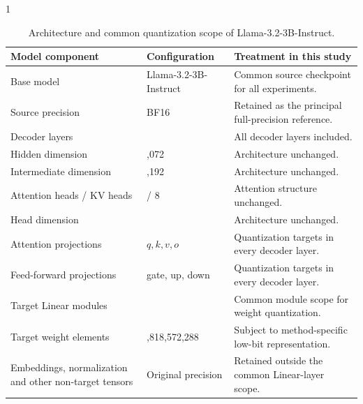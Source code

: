 \begin{table}[htbp]
\centering
\caption{Architecture and common quantization scope of
Llama-3.2-3B-Instruct.}
\label{tab:model-architecture-scope}

\begin{spacing}{1}
\small
\renewcommand{\arraystretch}{1.22}

\begin{tabularx}{\textwidth}{
@{}
>{\raggedright\arraybackslash}p{}
>{\raggedright\arraybackslash}p{}
>{\raggedright\arraybackslash}X
@{}
}
\toprule
\textbf{Model component} &
\textbf{Configuration} &
\textbf{Treatment in this study} \\
\midrule

Base model &
Llama-3.2-3B-Instruct &
Common source checkpoint for all experiments. \\

Source precision &
BF16 &
Retained as the principal full-precision reference. \\

Decoder layers &
28 &
All decoder layers included. \\

Hidden dimension &
3,072 &
Architecture unchanged. \\

Intermediate dimension &
8,192 &
Architecture unchanged. \\

Attention heads / KV heads &
24 / 8 &
Attention structure unchanged. \\

Head dimension &
128 &
Architecture unchanged. \\

Attention projections &
\(q,k,v,o\) &
Quantization targets in every decoder layer. \\

Feed-forward projections &
gate, up, down &
Quantization targets in every decoder layer. \\

Target Linear modules &
196 &
Common module scope for weight quantization. \\

Target weight elements &
2,818,572,288 &
Subject to method-specific low-bit representation. \\

Embeddings, normalization and other non-target tensors &
Original precision &
Retained outside the common Linear-layer scope. \\

\bottomrule
\end{tabularx}
\end{spacing}
\end{table}

